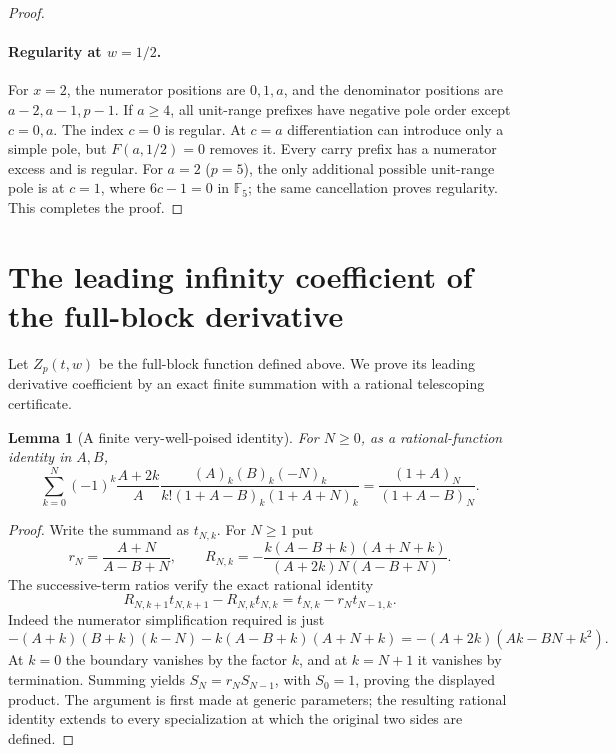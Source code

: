 \documentclass[11pt,letterpaper]{article}
\newtheorem{lemma}[theorem]{Lemma}
\numberwithin{equation}{section}
\begin{document}
\begin{proof}
\paragraph{Regularity at $w=1/2$.}
For $x=2$, the numerator positions are $0,1,a$, and the denominator
positions are $a-2,a-1,p-1$. If $a\ge4$, all unit-range prefixes have
negative pole order except $c=0,a$. The index $c=0$ is regular.
At $c=a$ differentiation can introduce only a simple pole, but
$F(a,1/2)=0$ removes it. Every carry prefix has a numerator excess
and is regular. For $a=2$ ($p=5$), the only additional possible
unit-range pole is at $c=1$, where $6c-1=0$ in $\mathbb F_5$;
the same cancellation proves regularity. This completes the proof.
\end{proof}

\section{The leading infinity coefficient of the full-block derivative}\label{loc-VIII-22}
\label{VIII-sec:E8-leading-infinity}
Let $Z_p(t,w)$ be the full-block function defined above. We prove
its leading derivative coefficient by an exact finite summation
with a rational telescoping certificate.

\begin{lemma}[A finite very-well-poised identity]\label{VIII-E8:finite-vwp}
For $N\ge0$, as a rational-function identity in $A,B$,
\[
 \sum_{k=0}^N(-1)^k\frac{A+2k}{A}
 \frac{(A)_k(B)_k(-N)_k}
 {k!(1+A-B)_k(1+A+N)_k}
 =\frac{(1+A)_N}{(1+A-B)_N}.
\]
\end{lemma}
\begin{proof}
Write the summand as $t_{N,k}$. For $N\ge1$ put
\[
 r_N=\frac{A+N}{A-B+N},\qquad
 R_{N,k}=-\frac{k(A-B+k)(A+N+k)}
 {(A+2k)N(A-B+N)}.
\]
The successive-term ratios verify the exact rational identity
\[
 R_{N,k+1}t_{N,k+1}-R_{N,k}t_{N,k}
 =t_{N,k}-r_Nt_{N-1,k}.
\]
Indeed the numerator simplification required is just
\[
 -(A+k)(B+k)(k-N)-k(A-B+k)(A+N+k)
 =-(A+2k)(Ak-BN+k^2).
\]
At $k=0$ the boundary vanishes by the factor $k$, and at $k=N+1$
it vanishes by termination. Summing yields $S_N=r_NS_{N-1}$,
with $S_0=1$, proving the displayed product. The argument is first
made at generic parameters; the resulting rational identity extends
to every specialization at which the original two sides are defined.
\end{proof}
\end{document}
